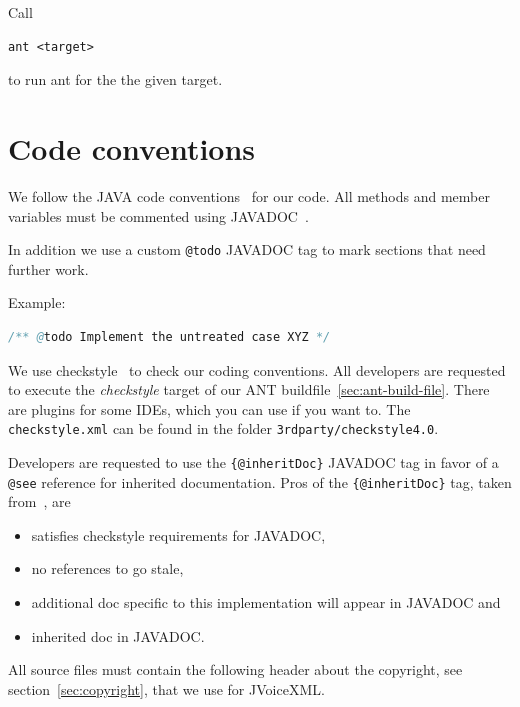 \documentclass[11pt,a4paper]{article}
\begin{document}
Call
\begin{lstlisting}
ant <target>
\end{lstlisting}
to run ant for the the given target.

\section{Code conventions}
\label{sec:code-conventions}

We follow the JAVA code conventions~\cite{sun:codeconv} for our code. All
methods and member variables must be commented using 
JAVADOC~\cite{sun:javadoc_guidelines}.

In addition we use a custom \texttt{@todo} JAVADOC tag to mark
sections that need further work.

Example:

\begin{lstlisting}[language=Java]
/** @todo Implement the untreated case XYZ */
\end{lstlisting}

We use checkstyle~\cite{checkstyle} to check our coding conventions.
All developers are requested to execute the \emph{checkstyle} target
of our ANT buildfile~\ref{sec:ant-build-file}. 
There are plugins for some IDEs, which you can use if you want to. The
\texttt{checkstyle.xml} can be found in the folder 
\texttt{3rdparty/checkstyle4.0}.

Developers are requested to use the \texttt{\{@inheritDoc\}} JAVADOC
tag in favor of a \texttt{@see} reference for inherited documentation.
Pros of the \texttt{\{@inhe\-rit\-Doc\}} tag, taken 
from~\cite{tauber:inheritdoc}, are
\begin{itemize}
\item satisfies checkstyle requirements for JAVADOC,
\item no references to go stale,
\item additional doc specific to this implementation will appear in JAVADOC and
\item inherited doc in JAVADOC.
\end{itemize}

All source files must contain the following header about the 
copyright, see section~\ref{sec:copyright}, that we use for JVoiceXML.
\end{document}
